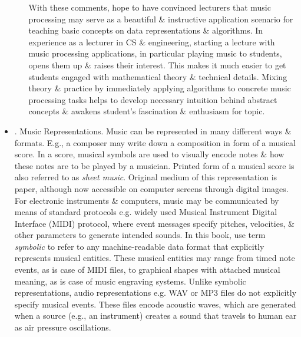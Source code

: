 \documentclass{article}
\begin{document}
\begin{itemize}
\begin{itemize}
		With these comments, hope to have convinced lecturers that music processing may serve as a beautiful \& instructive application scenario for teaching basic concepts on data representations \& algorithms. In experience as a lecturer in CS \& engineering, starting a lecture with music processing applications, in particular playing music to students, opens them up \& raises their interest. This makes it much easier to get students engaged with mathematical theory \& technical details. Mixing theory \& practice by immediately applying algorithms to concrete music processing tasks helps to develop necessary intuition behind abstract concepts \& awakens student's fascination \& enthusiasm for topic.
	\end{itemize}	
	\item {. Music Representations.} Music can be represented in many different ways \& formats. E.g., a composer may write down a composition in form of a musical score. In a score, musical symbols are used to visually encode notes \& how these notes are to be played by a musician. Printed form of a musical score is also referred to as {\it sheet music}. Original medium of this representation is paper, although now accessible on computer screens through digital images. For electronic instruments \& computers, music may be communicated by means of standard protocols e.g. widely used Musical Instrument Digital Interface (MIDI) protocol, where event messages specify pitches, velocities, \& other parameters to generate intended sounds. In this book, use term {\it symbolic} to refer to any machine-readable data format that explicitly represents musical entities. These musical entities may range from timed note events, as is case of MIDI files, to graphical shapes with attached musical meaning, as is case of music engraving systems. Unlike symbolic representations, audio representations e.g. WAV or MP3 files do not explicitly specify musical events. These files encode acoustic waves, which are generated when a source (e.g., an instrument) creates a sound that travels to human ear as air pressure oscillations.
	

\end{itemize}
\end{document}
